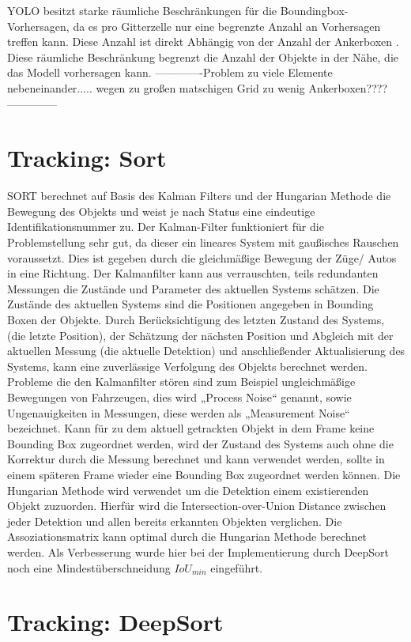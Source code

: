 \documentclass[conference]{IEEEtran}
\begin{document}
	YOLO besitzt starke räumliche Beschränkungen für die Boundingbox-Vorhersagen, da es pro Gitterzelle nur eine begrenzte Anzahl an Vorhersagen treffen kann. Diese Anzahl ist direkt Abhängig von der Anzahl der Ankerboxen \cite{b3}. Diese räumliche Beschränkung begrenzt die Anzahl der Objekte in der Nähe, die das Modell vorhersagen kann. 
	-------------Problem zu viele Elemente nebeneinander..... wegen zu großen matschigen Grid zu wenig Ankerboxen????--------------

	\section{Tracking: Sort}
	SORT berechnet auf Basis des Kalman Filters und der Hungarian Methode die Bewegung des Objekts und weist je nach Status eine eindeutige Identifikationsnummer zu. Der Kalman-Filter funktioniert für die Problemstellung sehr gut, da dieser ein lineares System mit gaußisches Rauschen voraussetzt. Dies ist gegeben durch die gleichmäßige Bewegung der Züge/ Autos in eine Richtung.
	Der Kalmanfilter kann aus verrauschten, teils redundanten Messungen die Zustände und Parameter des aktuellen Systems schätzen. Die Zustände des aktuellen Systems sind die Positionen angegeben in Bounding Boxen der Objekte. Durch Berücksichtigung des letzten Zustand des Systems, (die letzte Position), der Schätzung der nächsten Position und Abgleich mit der aktuellen Messung (die aktuelle Detektion) und anschließender Aktualisierung des Systems, kann eine zuverlässige Verfolgung des Objekts berechnet werden. Probleme die den Kalmanfilter stören sind zum Beispiel ungleichmäßige Bewegungen von Fahrzeugen, dies wird „Process Noise“ genannt, sowie Ungenauigkeiten in Messungen, diese werden als „Measurement Noise“ bezeichnet.
	Kann für zu dem aktuell getrackten Objekt in dem Frame keine Bounding Box zugeordnet werden, wird der Zustand des Systems auch ohne die Korrektur durch die Messung berechnet und kann verwendet werden, sollte in einem späteren Frame wieder eine Bounding Box zugeordnet werden können. 
	Die Hungarian Methode wird verwendet um die Detektion einem existierenden Objekt zuzuorden. Hierfür wird die Intersection-over-Union Distance zwischen jeder Detektion und allen bereits erkannten Objekten verglichen. Die Assoziationsmatrix kann optimal durch die Hungarian Methode berechnet werden. Als Verbesserung wurde hier bei der Implementierung durch DeepSort noch eine Mindestüberschneidung $IoU_{min}$ eingeführt.
	
	
	\section{Tracking: DeepSort}
	
\end{document}
